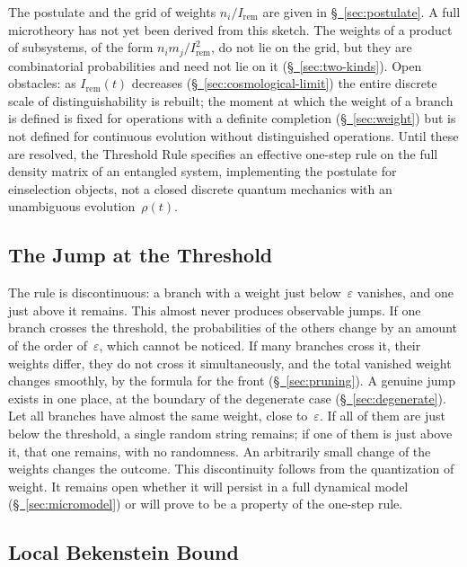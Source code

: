 \documentclass[11pt,a4paper]{article}
\newcommand{\Ost}{I_{\mathrm{rem}}}
\newcommand{\CollapseRule}{Threshold Rule}
\begin{document}
The postulate and the grid of weights $n_i/\Ost$ are given in \hyperref[sec:postulate]{\S~\ref*{sec:postulate}}. A full microtheory has not yet been derived from this sketch. The weights of a product of subsystems, of the form $n_i m_j/\Ost^2$, do not lie on the grid, but they are combinatorial probabilities and need not lie on it (\hyperref[sec:two-kinds]{\S~\ref*{sec:two-kinds}}). Open obstacles: as $\Ost(t)$ decreases (\hyperref[sec:cosmological-limit]{\S~\ref*{sec:cosmological-limit}}) the entire discrete scale of distinguishability is rebuilt; the moment at which the weight of a branch is defined is fixed for operations with a definite completion (\hyperref[sec:weight]{\S~\ref*{sec:weight}}) but is not defined for continuous evolution without distinguished operations. Until these are resolved, the \CollapseRule{} specifies an effective one-step rule on the full density matrix of an entangled system, implementing the postulate for einselection objects, not a closed discrete quantum mechanics with an unambiguous evolution~$\rho(t)$.

\subsection{The Jump at the Threshold}

The rule is discontinuous: a branch with a weight just below~$\varepsilon$ vanishes, and one just above it remains. This almost never produces observable jumps. If one branch crosses the threshold, the probabilities of the others change by an amount of the order of~$\varepsilon$, which cannot be noticed. If many branches cross it, their weights differ, they do not cross it simultaneously, and the total vanished weight changes smoothly, by the formula for the front (\hyperref[sec:pruning]{\S~\ref*{sec:pruning}}). A genuine jump exists in one place, at the boundary of the degenerate case (\hyperref[sec:degenerate]{\S~\ref*{sec:degenerate}}). Let all branches have almost the same weight, close to~$\varepsilon$. If all of them are just below the threshold, a single random string remains; if one of them is just above it, that one remains, with no randomness. An arbitrarily small change of the weights changes the outcome. This discontinuity follows from the quantization of weight. It remains open whether it will persist in a full dynamical model (\hyperref[sec:micromodel]{\S~\ref*{sec:micromodel}}) or will prove to be a property of the one-step rule.

\subsection{Local Bekenstein Bound}
\end{document}
